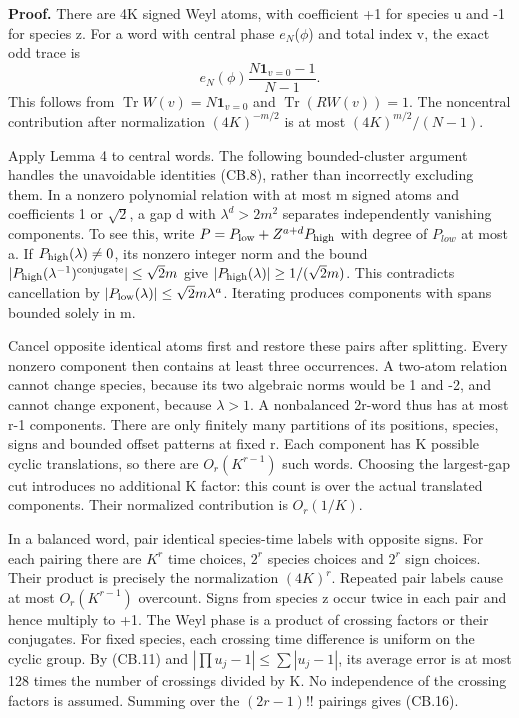 \textbf{Proof.} There are 4K signed Weyl atoms, with coefficient +1 for species u and -1 for species z. For a word with central phase \(e_{N}\)(\(\phi\)) and total index v, the exact odd trace is \[
 e_N(\phi)\frac{N\mathbf1_{v=0}-1}{N-1}.                       \tag{CB.17}
\] This follows from \(\operatorname{Tr}W(v)=N\mathbf1_{v=0}\) and \(\operatorname{Tr}(RW(v))=1\). The noncentral contribution after normalization \((4K)^{-m/2}\) is at most \((4K)^{m/2}/(N-1)\).

Apply Lemma 4 to central words. The following bounded-cluster argument handles the unavoidable identities (CB.8), rather than incorrectly excluding them. In a nonzero polynomial relation with at most m signed atoms and coefficients 1 or \(\sqrt2\), a gap d with \(\lambda^d>2m^2\) separates independently vanishing components. To see this, write \(P=P_{\rm low}+Z^{a+d}P_{\rm high}\) with degree of \(P_{low}\) at most a. If \(P_{\rm high}(\lambda)\ne0\), its nonzero integer norm and the bound \(|P_{\rm high}(\lambda^{-1})^{\rm conjugate}|\leq\sqrt2m\) give \(|P_{\rm high}(\lambda)|\geq1/(\sqrt2m)\). This contradicts cancellation by \(|P_{\rm low}(\lambda)|\leq\sqrt2m\lambda^a\). Iterating produces components with spans bounded solely in m.

Cancel opposite identical atoms first and restore these pairs after splitting. Every nonzero component then contains at least three occurrences. A two-atom relation cannot change species, because its two algebraic norms would be 1 and -2, and cannot change exponent, because \(\lambda>1\). A nonbalanced 2r-word thus has at most r-1 components. There are only finitely many partitions of its positions, species, signs and bounded offset patterns at fixed r. Each component has K possible cyclic translations, so there are \(O_r(K^{r-1})\) such words. Choosing the largest-gap cut introduces no additional K factor: this count is over the actual translated components. Their normalized contribution is \(O_r(1/K)\).

In a balanced word, pair identical species-time labels with opposite signs. For each pairing there are \(K^r\) time choices, \(2^r\) species choices and \(2^r\) sign choices. Their product is precisely the normalization \((4K)^r\). Repeated pair labels cause at most \(O_r(K^{r-1})\) overcount. Signs from species z occur twice in each pair and hence multiply to +1. The Weyl phase is a product of crossing factors or their conjugates. For fixed species, each crossing time difference is uniform on the cyclic group. By (CB.11) and \(|\prod u_j-1|\leq\sum|u_j-1|\), its average error is at most 128 times the number of crossings divided by K. No independence of the crossing factors is assumed. Summing over the \((2r-1)!!\) pairings gives (CB.16).

